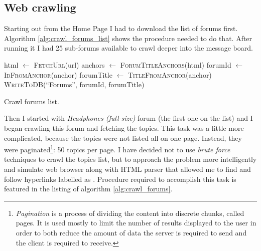   \subsection{Web crawling}
    \label{sec:crawling}
    
      Starting out from the Home Page I had to download the list of forums first. Algorithm \ref{alg:crawl_forums_list} shows the procedure needed to do that. After running it I had 25 sub-forums available to crawl deeper into the message board.
  
    \begin{algorithm}[H]
      \begin{algorithmic}[1]
          \State html $\gets$ \textsc{FetchUrl}(url)
          \State anchors $\gets$ \textsc{ForumTitleAnchors}(html)
            \State forumId $\gets$ \textsc{IdFromAnchor}(anchor)
            \State forumTitle $\gets$ \textsc{TitleFromAnchor}(anchor)
            \State \textsc{WriteToDB}(``Forums'', forumId, forumTitle)
          \EndFor
        \EndProcedure
      \end{algorithmic}
      \caption{Crawl forums list.}
      \label{alg:crawl_forums_list}
    \end{algorithm}
    
    Then I started with \emph{Headphones (full-size)} forum (the first one on the list) and I began crawling this forum and fetching the topics. This task was a little more complicated, because the topics were not listed all on one page. Instead, they were paginated\footnote{\emph{Pagination} is a process of dividing the content into discrete chunks, called pages. It is used mostly to limit the number of results displayed to the user in order to both reduce the amount of data the server is required to send and the client is required to receive.}: 50 topics per page. I have decided not to use \emph{brute force} techniques to crawl the topics list, but to approach the problem more intelligently and simulate web browser along with HTML parser that allowed me to find and follow hyperlinks labelled as . Procedure required to accomplish this task is featured in the listing of algorithm \ref{alg:crawl_forums}.
  
